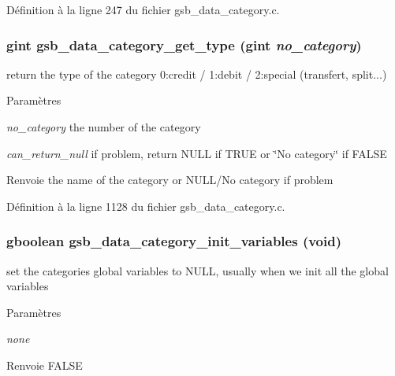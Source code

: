 Définition à la ligne 247 du fichier gsb\_\-data\_\-category.c.

\subsubsection[{gsb\_\-data\_\-category\_\-get\_\-type}]{\setlength{\rightskip}{0pt plus 5cm}gint gsb\_\-data\_\-category\_\-get\_\-type (gint {\em no\_\-category})}\label{gsb__data__category_8c_ad207c5dac58f010fe8c73c4e2f2f5a58}
return the type of the category 0:credit / 1:debit / 2:special (transfert, split...)


\begin{DoxyParams}{Paramètres}
\item[{\em no\_\-category}]the number of the category \item[{\em can\_\-return\_\-null}]if problem, return NULL if TRUE or \char`\"{}No category\char`\"{} if FALSE\end{DoxyParams}
\begin{DoxyReturn}{Renvoie}
the name of the category or NULL/No category if problem 
\end{DoxyReturn}


Définition à la ligne 1128 du fichier gsb\_\-data\_\-category.c.

\subsubsection[{gsb\_\-data\_\-category\_\-init\_\-variables}]{\setlength{\rightskip}{0pt plus 5cm}gboolean gsb\_\-data\_\-category\_\-init\_\-variables (void)}\label{gsb__data__category_8c_a0efec43fb6122b3f83bf71995d2a2459}
set the categories global variables to NULL, usually when we init all the global variables


\begin{DoxyParams}{Paramètres}
\item[{\em none}]\end{DoxyParams}
\begin{DoxyReturn}{Renvoie}
FALSE 
\end{DoxyReturn}


